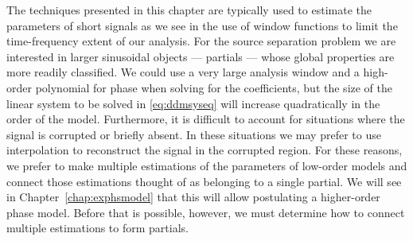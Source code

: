 The techniques presented in this chapter are typically used to estimate the
parameters of short signals as we see in the use of window functions to limit
the time-frequency extent of our analysis. For the source separation problem we
are interested in larger sinusoidal objects --- partials --- whose global
properties are more readily classified. We could use a very large
analysis window and a high-order polynomial for phase when solving for the
coefficients, but the size of the linear system to be solved in
\ref{eq:ddmsyseq} will increase quadratically in the order of the model.
Furthermore, it is difficult to account for situations where the signal is
corrupted or briefly absent. In these situations we may prefer to use
interpolation to reconstruct the signal in the corrupted region. For these
reasons, we prefer to make multiple estimations of the parameters of low-order
models and connect those estimations thought of as belonging to a single
partial. We will see in Chapter~\ref{chap:exphsmodel} that this will allow
postulating a higher-order phase model. Before that is possible, however, we
must determine how to connect multiple estimations to form partials.
